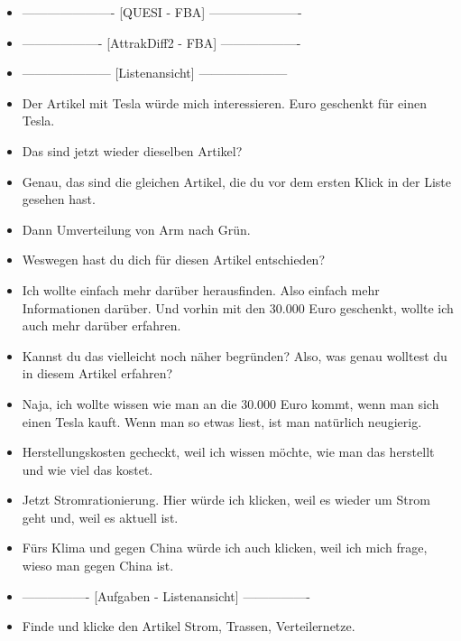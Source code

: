 {\begin{itemize}[]
            \item {----------------------} [QUESI - FBA] {----------------------}
            \item {-------------------} [AttrakDiff2 - FBA] {-------------------}
            \item {---------------------} [Listenansicht] {---------------------}
            \item {} Der Artikel mit Tesla würde mich interessieren.  Euro geschenkt für einen Tesla\frqq{}.
            \item {} Das sind jetzt wieder dieselben Artikel?
            \item {} Genau, das sind die gleichen Artikel, die du vor dem ersten Klick in der Liste gesehen hast.
            \item {} Dann \flqq Umverteilung von Arm nach Grün\frqq{}.
            \item {} Weswegen hast du dich für diesen Artikel entschieden?
            \item {} Ich wollte einfach mehr darüber herausfinden.
                  Also einfach mehr Informationen darüber.
                  Und vorhin mit den 30.000 Euro geschenkt, wollte ich auch mehr darüber erfahren.
            \item {} Kannst du das vielleicht noch näher begründen?
                  Also, was genau wolltest du in diesem Artikel erfahren?
            \item {} Naja, ich wollte wissen wie man an die 30.000 Euro kommt, wenn man sich einen Tesla kauft.
                  Wenn man so etwas liest, ist man natürlich neugierig.
            \item {} \flqq Herstellungskosten gecheckt\frqq{}, weil ich wissen möchte, wie man das herstellt und wie viel das kostet.
            \item {} Jetzt \flqq Stromrationierung\frqq{}. Hier würde ich klicken, weil es wieder um Strom geht und, weil es aktuell ist.
            \item {} \flqq Fürs Klima und gegen China\frqq{} würde ich auch klicken, weil ich mich frage, wieso man gegen China ist.
            \item {----------------} [Aufgaben - Listenansicht] {----------------}
            \item {} Finde und klicke den Artikel \flqq Strom, Trassen, Verteilernetze\frqq{}.

\end{itemize}}
